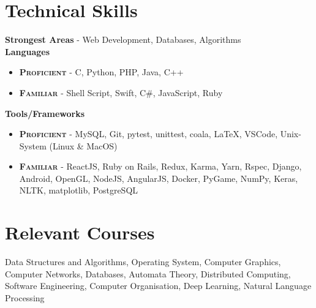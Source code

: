 \documentclass[margin, centered]{res}
\begin{document}
\begin{resume}
        \section{Technical \hspace{2mm} Skills}
            \textbf{Strongest Areas} - Web Development, Databases, Algorithms \\
            \textbf{Languages}
            \begin{itemize}
                \item \textbf{\textsc{Proficient}} - C, Python, PHP, Java, C++
                \item \textbf{\textsc{Familiar}} - Shell Script, Swift, C\#, JavaScript, Ruby
            \end{itemize}
            \textbf{Tools/Frameworks}
            \begin{itemize}
                \item \textbf{\textsc{Proficient}} - MySQL, Git, pytest, unittest, coala, \LaTeX, VSCode, Unix-System (Linux \& MacOS)
                \item \textbf{\textsc{Familiar}} - ReactJS, Ruby on Rails, Redux, Karma, Yarn, Rspec, Django, Android, OpenGL, NodeJS, AngularJS, Docker, PyGame, NumPy, Keras, NLTK, matplotlib, PostgreSQL
            \end{itemize}

        \section{Relevant \hspace{2mm} Courses}
            Data Structures and Algorithms, Operating System, Computer Graphics, Computer Networks,
            Databases, Automata Theory, Distributed Computing, Software Engineering, Computer Organisation, Deep Learning, Natural Language Processing


\end{resume}
\end{document}
